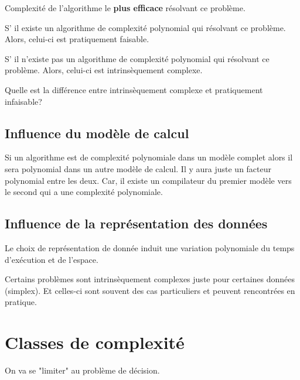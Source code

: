 \begin{mydef} Complexité de l'algorithme le 
	\textbf{plus efficace} résolvant ce problème.
\end{mydef}

\begin{mydef}
	S’ il existe un algorithme de complexité polynomial qui résolvant ce 
	problème. Alors, celui-ci est pratiquement faisable.
\end{mydef}

\begin{mydef}
	S’ il n'existe pas un algorithme de complexité polynomial qui résolvant ce 
	problème. Alors, celui-ci est intrinsèquement complexe.
\end{mydef}

\begin{myrem}
	Quelle est la différence entre intrinsèquement complexe et pratiquement 
	infaisable?
\end{myrem}

\subsection{Influence du modèle de calcul}
\label{sub:influence_du_mod_le_de_calcul}
Si un algorithme est de complexité polynomiale dans un modèle complet alors il sera 
polynomial dans un autre modèle de calcul. Il y aura juste un facteur 
polynomial entre les deux. Car, il existe un compilateur du premier modèle vers 
le second qui a une complexité polynomiale.

\subsection{Influence de la représentation des données}
\label{sub:influence_de_la_repr_sentation_des_donn_es}
Le choix de représentation de donnée induit une variation polynomiale du temps 
d'exécution et de l'espace.

\begin{myrem}
	Certains problèmes sont intrinsèquement complexes juste pour certaines 
	données (simplex). Et celles-ci sont souvent des cas particuliers et peuvent 
	rencontrées en pratique.
\end{myrem}


\section{Classes de complexité}
\label{sec:classes_de_complexit_}
On va se "limiter" au problème de décision.

